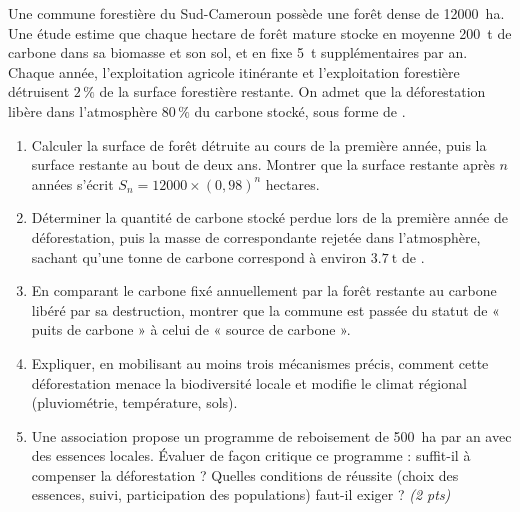 \documentclass[11pt]{article}
\begin{document}
\begin{exercice}
Une commune forestière du Sud-Cameroun possède une forêt dense de \SI{12000}{\hectare}. Une étude estime que chaque hectare de forêt mature stocke en moyenne \SI{200}{\tonne} de carbone dans sa biomasse et son sol, et en fixe \SI{5}{\tonne} supplémentaires par an. Chaque année, l'exploitation agricole itinérante et l'exploitation forestière détruisent $2\,\%$ de la surface forestière restante. On admet que la déforestation libère dans l'atmosphère $80\,\%$ du carbone stocké, sous forme de .

\begin{enumerate}
\item Calculer la surface de forêt détruite au cours de la première année, puis la surface restante au bout de deux ans. Montrer que la surface restante après $n$ années s'écrit $S_n = 12000 \times (0{,}98)^n$ hectares.
\item Déterminer la quantité de carbone stocké perdue lors de la première année de déforestation, puis la masse de  correspondante rejetée dans l'atmosphère, sachant qu'une tonne de carbone correspond à environ $\SI{3,7}{\tonne}$ de .
\item En comparant le carbone fixé annuellement par la forêt restante au carbone libéré par sa destruction, montrer que la commune est passée du statut de « puits de carbone » à celui de « source de carbone ».
\item Expliquer, en mobilisant au moins trois mécanismes précis, comment cette déforestation menace la biodiversité locale et modifie le climat régional (pluviométrie, température, sols).
\item Une association propose un programme de reboisement de \SI{500}{\hectare} par an avec des essences locales. Évaluer de façon critique ce programme : suffit-il à compenser la déforestation ? Quelles conditions de réussite (choix des essences, suivi, participation des populations) faut-il exiger ? \textit{(2 pts)}
\end{enumerate}
\end{exercice}
\end{document}
